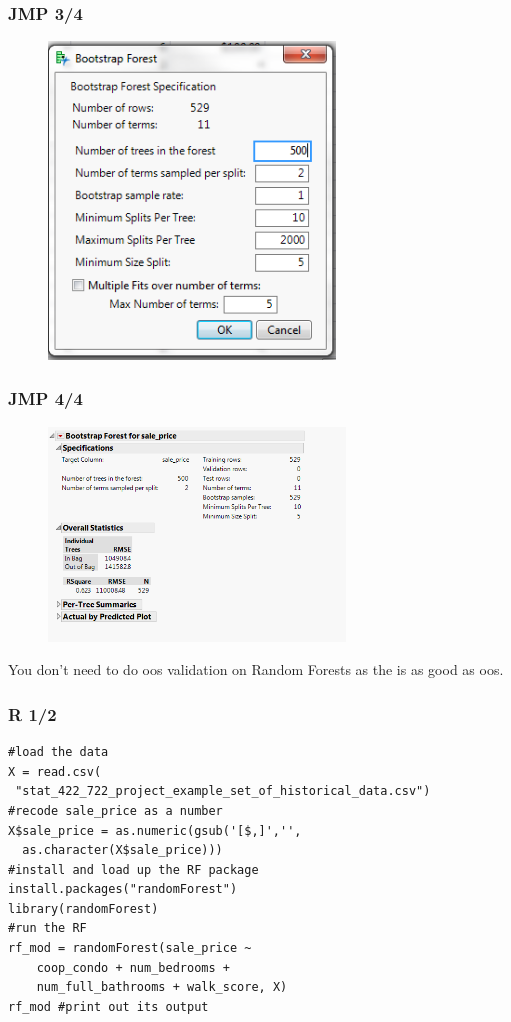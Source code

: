 \documentclass[handout]{beamer}
\begin{document}
\begin{frame}\frametitle{JMP 3/4}

\begin{figure}
\centering
\includegraphics[width=3.0in]{jmp03.png}
\end{figure}
	
\end{frame}


\begin{frame}\frametitle{JMP 4/4}

\begin{figure}
\centering
\includegraphics[width=3.1in]{jmp04.png}
\end{figure}
You don't need to do oos validation on Random Forests as the  is as good as oos.
\end{frame}

\begin{frame}[fragile]\frametitle{R 1/2}

\begin{verbatim}
#load the data
X = read.csv(
 "stat_422_722_project_example_set_of_historical_data.csv")
#recode sale_price as a number
X$sale_price = as.numeric(gsub('[$,]','',
  as.character(X$sale_price)))
#install and load up the RF package
install.packages("randomForest")
library(randomForest)
#run the RF
rf_mod = randomForest(sale_price ~ 
	coop_condo + num_bedrooms + 
	num_full_bathrooms + walk_score, X)
rf_mod #print out its output
\end{verbatim}


\end{frame}
\end{document}
